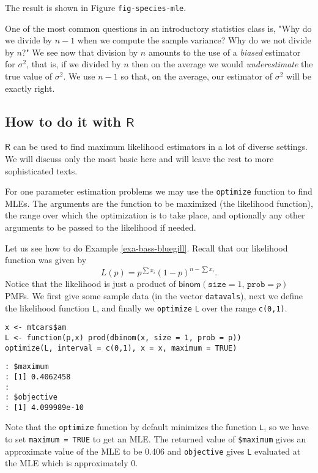The result is shown in Figure \texttt{fig-species-mle}.

One of the most common questions in an introductory statistics class
is, "Why do we divide by \(n-1\) when we compute the sample variance?
Why do we not divide by \(n\)?" We see now that division by \(n\)
amounts to the use of a \emph{biased} estimator for \(\sigma^{2}\), that
is, if we divided by \(n\) then on the average we would
\emph{underestimate} the true value of \(\sigma^{2}\). We use \(n-1\) so
that, on the average, our estimator of \(\sigma^{2}\) will be exactly
right.

\subsection{How to do it with \(\mathsf{R}\)}
\label{sec-9-1-1}

\(\mathsf{R}\) can be used to find maximum likelihood estimators in a
lot of diverse settings. We will discuss only the most basic here and
will leave the rest to more sophisticated texts.

For one parameter estimation problems we may use the \texttt{optimize}
function to find MLEs. The arguments are the function to be maximized
(the likelihood function), the range over which the optimization is to
take place, and optionally any other arguments to be passed to the
likelihood if needed.

Let us see how to do Example \ref{exa-bass-bluegill}. Recall that our
likelihood function was given by
\begin{equation}
L(p)=p^{\sum x_{i}}(1-p)^{n-\sum x_{i}}.
\end{equation}
Notice that the likelihood is just a product of
\(\mathsf{binom}(\mathtt{size}=1,\,\mathtt{prob}=p)\) PMFs. We first
give some sample data (in the vector \texttt{datavals}), next we define the
likelihood function \texttt{L}, and finally we \texttt{optimize} \texttt{L} over the range
\texttt{c(0,1)}.

\begin{verbatim}
x <- mtcars$am
L <- function(p,x) prod(dbinom(x, size = 1, prob = p))
optimize(L, interval = c(0,1), x = x, maximum = TRUE)
\end{verbatim}

\begin{verbatim}
: $maximum
: [1] 0.4062458
: 
: $objective
: [1] 4.099989e-10
\end{verbatim}

Note that the \texttt{optimize} function by default minimizes the function
\texttt{L}, so we have to set \texttt{maximum = TRUE} to get an MLE. The returned
value of \texttt{\$maximum} gives an approximate value of the MLE to be
0.406 and \texttt{objective} gives \texttt{L} evaluated at the
MLE which is approximately 0.

